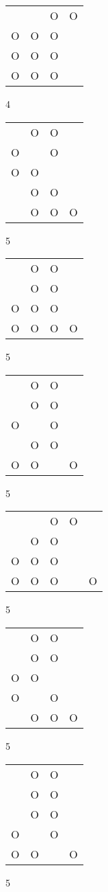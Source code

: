 \begin{tabular}{|m{0.2cm}m{0.2cm}m{0.2cm}m{0.2cm}|}\hline
 & &O&O\\
O&O&O& \\
O&O&O& \\
O&O&O& \\
\hline\end{tabular}4
\begin{tabular}{|m{0.2cm}m{0.2cm}m{0.2cm}m{0.2cm}|}\hline
 &O&O& \\
O& &O& \\
O&O& & \\
 &O&O& \\
 &O&O&O\\
\hline\end{tabular}5
\begin{tabular}{|m{0.2cm}m{0.2cm}m{0.2cm}m{0.2cm}|}\hline
 &O&O& \\
 &O&O& \\
O&O&O& \\
O&O&O&O\\
\hline\end{tabular}5
\begin{tabular}{|m{0.2cm}m{0.2cm}m{0.2cm}m{0.2cm}|}\hline
 &O&O& \\
 &O&O& \\
O& &O& \\
 &O&O& \\
O&O& &O\\
\hline\end{tabular}5
\begin{tabular}{|m{0.2cm}m{0.2cm}m{0.2cm}m{0.2cm}m{0.2cm}|}\hline
 & &O&O& \\
 &O&O& & \\
O&O&O& & \\
O&O&O& &O\\
\hline\end{tabular}5
\begin{tabular}{|m{0.2cm}m{0.2cm}m{0.2cm}m{0.2cm}|}\hline
 &O&O& \\
 &O&O& \\
O&O& & \\
O& &O& \\
 &O&O&O\\
\hline\end{tabular}5
\begin{tabular}{|m{0.2cm}m{0.2cm}m{0.2cm}m{0.2cm}|}\hline
 &O&O& \\
 &O&O& \\
 &O&O& \\
O& &O& \\
O&O& &O\\
\hline\end{tabular}5
